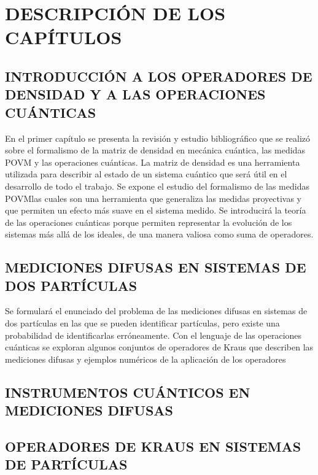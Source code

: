 \chapter{DESCRIPCIÓN DE LOS CAPÍTULOS} 
\section{INTRODUCCIÓN A LOS OPERADORES DE DENSIDAD Y A LAS OPERACIONES CUÁNTICAS}
En el primer capítulo  se presenta la revisión y estudio bibliográfico que se realizó sobre el formalismo de la matriz de densidad en mecánica cuántica, las medidas POVM y las operaciones cuánticas. La matriz de densidad es una herramienta utilizada para describir al estado de un sistema cuántico que será útil en el desarrollo de todo el trabajo.  Se expone el estudio del formalismo de las medidas POVM\@ las cuales son una herramienta que generaliza las medidas proyectivas y que permiten un efecto más suave en el sistema medido.  Se introducirá la teoría de las operaciones cuánticas  porque permiten representar la evolución de los sistemas más allá de los ideales, de una manera valiosa como suma de operadores.

\section{MEDICIONES DIFUSAS EN SISTEMAS DE DOS PARTÍCULAS}
Se formulará el enunciado del problema de las mediciones difusas en sistemas de dos partículas en las que se pueden identificar partículas, pero existe una probabilidad de identificarlas erróneamente. Con el lenguaje de las operaciones cuánticas se exploran algunos conjuntos de operadores de Kraus que describen las mediciones difusas y ejemplos numéricos de la aplicación de los operadores




\section{ INSTRUMENTOS CUÁNTICOS EN MEDICIONES DIFUSAS} 


\section{OPERADORES DE KRAUS EN SISTEMAS DE \texorpdfstring{}{n} PARTÍCULAS}

 \lipsum[1]